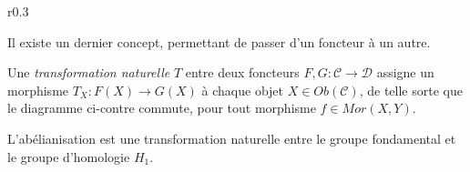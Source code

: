 \begin{wrapfigure}{r}{0.3\textwidth}
\centering
{}
\end{wrapfigure}

Il existe un dernier concept, permettant de passer d'un foncteur à un autre.

\begin{definition}
Une \emph{transformation naturelle} $T$ entre deux foncteurs $F,G:\mathcal{C}\to\mathcal{D}$ assigne un morphisme $T_X:F(X)\to G(X)$ à chaque objet $X\in Ob(\mathcal{C})$, de telle sorte que le diagramme ci-contre commute, pour tout morphisme $f\in Mor(X,Y)$.
\end{definition}

\begin{exemple}
L'abélianisation est une transformation naturelle entre le groupe fondamental et le groupe d'homologie $H_1$.
\end{exemple}